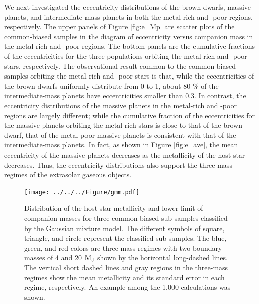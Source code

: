 \documentclass[twocolumn, dvipdfmx]{aastex62}
\begin{document}
\begin{CJK*}{UTF8}{min}
We next investigated the eccentricity distributions of the brown dwarfs, massive planets, and intermediate-mass planets in both the metal-rich and -poor regions, respectively. The upper panels of Figure \ref{fig:e_Mp} are scatter plots of the common-biased samples in the diagram of eccentricity versus companion mass in the metal-rich and -poor regions. The bottom panels are the cumulative fractions of the eccentricities for the three populations orbiting the metal-rich and -poor stars, respectively. The observational result common to the common-biased samples orbiting the metal-rich and -poor stars is that, while the eccentricities of the brown dwarfs uniformly distribute from 0 to 1, about 80 \% of the intermediate-mass planets have eccentricities smaller than 0.3. In contrast, the eccentricity distributions of the massive planets in the metal-rich and -poor regions are largely different; while the cumulative fraction of the eccentricities for the massive planets orbiting the metal-rich stars is close to that of the brown dwarf, that of the metal-poor massive planets is consistent with that of the intermediate-mass planets. In fact, as shown in Figure \ref{fig:e_ave}, the mean eccentricity of the massive planets decreases as the metallicity of the host star decreases. Thus, the eccentricity distributions also support the three-mass regimes of the extrasolar gaseous objects.

\begin{figure}[t]
\begin{center}
\texttt{[image: ../../../Figure/gmm.pdf]}
\caption{Distribution of the host-star metallicity and lower limit of companion masses for three common-biased sub-samples classified by the Gaussian mixture model. The different symbols of square, triangle, and circle represent the classified sub-samples. The blue, green, and red colors are three-mass regimes with two boundary masses of 4 and 20 $\rm M_J$ shown by the horizontal long-dashed lines. The vertical short dashed lines and gray regions in the three-mass regimes show the mean metallicity and its standard error in each regime, respectively. An example among the 1,000 calculations was shown. \label{fig:gmm}}
\end{center}
\end{figure}


\end{CJK*}
\end{document}
